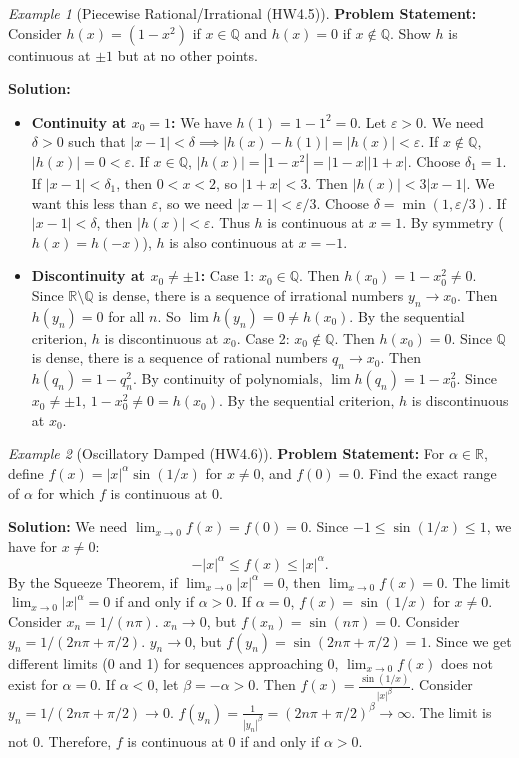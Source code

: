\documentclass{article}
\theoremstyle{definition}
\theoremstyle{plain}
\theoremstyle{remark}
\newtheorem{example}{Example}[section]
\newcommand{\R}{\mathbb{R}}
\newcommand{\Q}{\mathbb{Q}}
\newcommand{\eps}{\varepsilon}
\begin{document}
\begin{example}[Piecewise Rational/Irrational (HW4.5)]
\textbf{Problem Statement:} Consider \(h(x) = (1 - x^2)\) if \(x \in \Q\) and \(h(x)=0\) if \(x \notin \Q\). Show \(h\) is continuous at \(\pm 1\) but at no other points.

\textbf{Solution:}
\begin{itemize}
    \item \textbf{Continuity at \(x_0 = 1\):} We have \(h(1) = 1-1^2 = 0\). Let \(\eps > 0\). We need \(\delta > 0\) such that \(|x-1|<\delta \implies |h(x)-h(1)| = |h(x)| < \eps\).
        If \(x \notin \Q\), \(|h(x)| = 0 < \eps\).
        If \(x \in \Q\), \(|h(x)| = |1-x^2| = |1-x||1+x|\).
        Choose \(\delta_1 = 1\). If \(|x-1|<\delta_1\), then \(0 < x < 2\), so \(|1+x| < 3\).
        Then \(|h(x)| < 3|x-1|\). We want this less than \(\eps\), so we need \(|x-1| < \eps/3\).
        Choose \(\delta = \min(1, \eps/3)\). If \(|x-1|<\delta\), then \(|h(x)| < \eps\).
        Thus \(h\) is continuous at \(x=1\). By symmetry (\(h(x)=h(-x)\)), \(h\) is also continuous at \(x=-1\).
    \item \textbf{Discontinuity at \(x_0 \ne \pm 1\):}
        Case 1: \(x_0 \in \Q\). Then \(h(x_0) = 1-x_0^2 \ne 0\). Since \(\R \setminus \Q\) is dense, there is a sequence of irrational numbers \(y_n \to x_0\). Then \(h(y_n) = 0\) for all \(n\). So \(\lim h(y_n) = 0 \ne h(x_0)\). By the sequential criterion, \(h\) is discontinuous at \(x_0\).
        Case 2: \(x_0 \notin \Q\). Then \(h(x_0) = 0\). Since \(\Q\) is dense, there is a sequence of rational numbers \(q_n \to x_0\). Then \(h(q_n) = 1-q_n^2\). By continuity of polynomials, \(\lim h(q_n) = 1 - x_0^2\). Since \(x_0 \ne \pm 1\), \(1-x_0^2 \ne 0 = h(x_0)\). By the sequential criterion, \(h\) is discontinuous at \(x_0\).
\end{itemize}
\end{example}

\begin{example}[Oscillatory Damped (HW4.6)]
\textbf{Problem Statement:} For \(\alpha \in \R\), define \(f(x) = |x|^\alpha \sin (1/x)\) for \(x \ne 0\), and \(f(0)=0\). Find the exact range of \(\alpha\) for which \(f\) is continuous at 0.

\textbf{Solution:} We need \(\lim_{x\to 0} f(x) = f(0) = 0\).
Since \(-1 \le \sin(1/x) \le 1\), we have for \(x \ne 0\):
\[ -|x|^\alpha \le f(x) \le |x|^\alpha. \]
By the Squeeze Theorem, if \(\lim_{x\to 0} |x|^\alpha = 0\), then \(\lim_{x\to 0} f(x) = 0\).
The limit \(\lim_{x\to 0} |x|^\alpha = 0\) if and only if \(\alpha > 0\).
If \(\alpha = 0\), \(f(x) = \sin(1/x)\) for \(x \ne 0\). Consider \(x_n = 1/(n\pi)\). \(x_n \to 0\), but \(f(x_n) = \sin(n\pi) = 0\). Consider \(y_n = 1/(2n\pi + \pi/2)\). \(y_n \to 0\), but \(f(y_n) = \sin(2n\pi + \pi/2) = 1\). Since we get different limits (0 and 1) for sequences approaching 0, \(\lim_{x\to 0} f(x)\) does not exist for \(\alpha=0\).
If \(\alpha < 0\), let \(\beta = -\alpha > 0\). Then \(f(x) = \frac{\sin(1/x)}{|x|^\beta}\). Consider \(y_n = 1/(2n\pi + \pi/2) \to 0\). \(f(y_n) = \frac{1}{|y_n|^\beta} = (2n\pi + \pi/2)^\beta \to \infty\). The limit is not 0.
Therefore, \(f\) is continuous at 0 if and only if \(\alpha > 0\).
\end{example}
\end{document}
